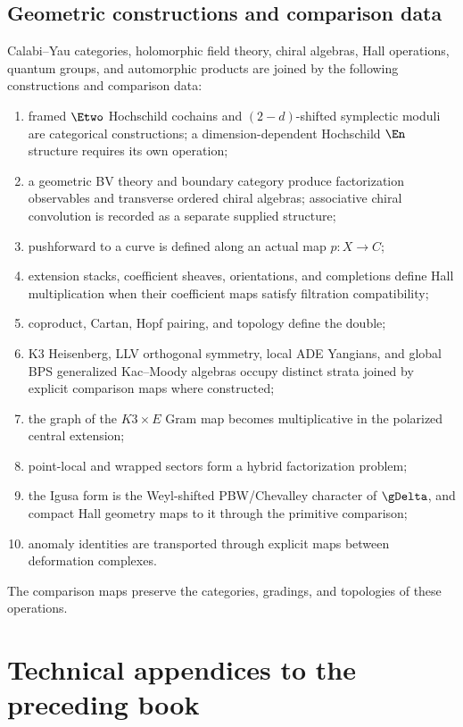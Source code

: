 \chapter{Geometric constructions and comparison data}
Calabi--Yau categories, holomorphic field theory, chiral algebras, Hall operations, quantum groups, and automorphic products are joined by the following constructions and comparison data:
\begin{enumerate}
\item framed $\Etwo$ Hochschild cochains and $(2-d)$-shifted symplectic moduli are categorical constructions; a dimension-dependent Hochschild $\En$ structure requires its own operation;
\item a geometric BV theory and boundary category produce factorization observables and transverse ordered chiral algebras; associative chiral convolution is recorded as a separate supplied structure;
\item pushforward to a curve is defined along an actual map $p:X\to C$;
\item extension stacks, coefficient sheaves, orientations, and completions define Hall multiplication when their coefficient maps satisfy filtration compatibility;
\item coproduct, Cartan, Hopf pairing, and topology define the double;
\item K3 Heisenberg, LLV orthogonal symmetry, local ADE Yangians, and global BPS generalized Kac--Moody algebras occupy distinct strata joined by explicit comparison maps where constructed;
\item the graph of the $K3\times E$ Gram map becomes multiplicative in the polarized central extension;
\item point-local and wrapped sectors form a hybrid factorization problem;
\item the Igusa form is the Weyl-shifted PBW/Chevalley character of $\gDelta$, and compact Hall geometry maps to it through the primitive comparison;
\item anomaly identities are transported through explicit maps between deformation complexes.
\end{enumerate}
The comparison maps preserve the categories, gradings, and topologies of these operations.

\part{Technical appendices to the preceding book}

